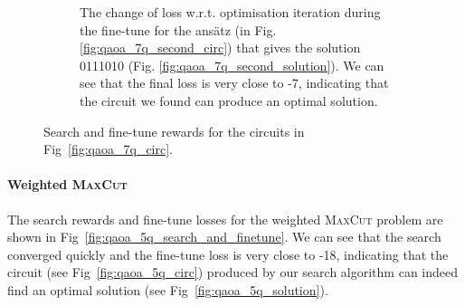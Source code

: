\documentclass[a4paper,onecolumn,11pt]{quantumarticle}
\begin{document}
\begin{figure}[H]
\begin{subfigure}[b]{0.48\linewidth}
        \caption{The change of loss w.r.t. optimisation iteration during the fine-tune for the ans\"atz (in Fig.\ref{fig:qaoa_7q_second_circ}) that gives the solution 0111010 (Fig. \ref{fig:qaoa_7q_second_solution}). We can see that the final loss is very close to -7, indicating that the circuit we found can produce an optimal solution.}
        \label{fig:qaoa_finetune_2}
    \end{subfigure}
    \caption{Search and fine-tune rewards for the circuits in Fig~\ref{fig:qaoa_7q_circ}. }\label{fig:qaoa_7q_search_finetune_both}
\end{figure}



\paragraph{Weighted \textsc{MaxCut}}
The search rewards and fine-tune losses for the weighted \textsc{MaxCut} problem are shown in Fig~\ref{fig:qaoa_5q_search_and_finetune}. We can see that the search converged quickly and the fine-tune loss is very close to -18, indicating that the circuit (see Fig~\ref{fig:qaoa_5q_circ}) produced by our search algorithm can indeed find an optimal solution (see Fig~\ref{fig:qaoa_5q_solution}).
\end{document}
